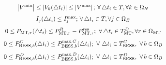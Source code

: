 \documentclass[journal]{IEEEtran}
\newcommand*\Laplace{\mathop{}\!\mathbin\bigtriangleup}
\begin{document}
    \begin{equation}
     \scalebox{0.9}[0.9]{$    
    \begin{split}
    \left| V_{{}}^{\min } \right|\le \left| {{V}_{k}}(\Laplace {{t}_{i}}) \right|\le \left| V_{{}}^{\max } \right|;\,\forall \Laplace {{t}_{i}}\in T,\forall k\in {{\Omega }_{N}}
    \end{split}
    $}
    \label{eqn12}
    \end{equation}
    \begin{equation}
         \scalebox{0.9}[0.9]{$    
    {{I}_{j}}(\Laplace {{t}_{i}})\le I_{j}^{\max};\,\forall \Laplace {{t}_{i}}\in T,\forall j\in {{\Omega }_{E}}
    $}
    \label{eqn13}
    \end{equation}
    \begin{equation}
            \scalebox{0.9}[0.9]{$
    \begin{split}
0\le {{P}_{\text{MT},r}}(\Laplace {{t}_{i}})\le P_{\text{MT},r}^{R}-P_{\text{MT},r}^{\text{res}};~
\forall \Laplace {{t}_{i}}\in T_{\text{MT}}^{D}, \forall r\in {{\Omega }_{\text{MT}}}
    \end{split}
    $}
    \label{eqn14}
    \end{equation}
    \begin{equation}
        \scalebox{0.9}[0.9]{$
    \begin{split}
0\le P_{\text{BESS},b}^{C}(\Laplace {{t}_{i}})\le P_{\text{BESS},b}^{\max, C}(\Laplace {{t}_{i}});
    ~\forall \,\Laplace {{t}_{i}}\in T_{\text{BESS}}^{C}, ~\forall \,b\in {{\Omega }_{B}}
    \end{split}
    $}
    \label{eqn15}
    \end{equation}
    \begin{equation}
    \scalebox{0.9}[0.9]{$
    \begin{split}
0 \leq P_{\text{BESS},b}^{D}(\Laplace {{t}_{i}}) \leq  P_{\text{BESS},b}^{\max, D}(\Laplace {{t}_{i}});
    ~\forall \,\Laplace {{t}_{i}}\in T_{\text{BESS}}^{D}, ~\forall \,b\in {{\Omega }_{B}}
    \end{split}
    $}
    \label{eqn16}
    \end{equation}
\end{document}
